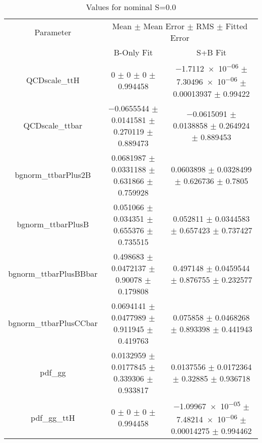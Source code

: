 \begin{table}
\centering
\caption{Values for nominal S=0.0}
\begin{tabular}{ccc}
\toprule
Parameter & \multicolumn{2}{c}{Mean $\pm$ Mean Error $\pm$ RMS $\pm$ Fitted Error}\\
 & B-Only Fit & S+B Fit\\
\midrule
QCDscale\_ttH & \num{0} $\pm$ \num{0} $\pm$ \num{0} $\pm$ \num{0.994458} & \num{-1.7112e-06} $\pm$ \num{7.30496e-06} $\pm$ \num{0.00013937} $\pm$ \num{0.99422}\\
QCDscale\_ttbar & \num{-0.0655544} $\pm$ \num{0.0141581} $\pm$ \num{0.270119} $\pm$ \num{0.889473} & \num{-0.0615091} $\pm$ \num{0.0138858} $\pm$ \num{0.264924} $\pm$ \num{0.889453}\\
bgnorm\_ttbarPlus2B & \num{0.0681987} $\pm$ \num{0.0331188} $\pm$ \num{0.631866} $\pm$ \num{0.759928} & \num{0.0603898} $\pm$ \num{0.0328499} $\pm$ \num{0.626736} $\pm$ \num{0.7805}\\
bgnorm\_ttbarPlusB & \num{0.051066} $\pm$ \num{0.034351} $\pm$ \num{0.655376} $\pm$ \num{0.735515} & \num{0.052811} $\pm$ \num{0.0344583} $\pm$ \num{0.657423} $\pm$ \num{0.737427}\\
bgnorm\_ttbarPlusBBbar & \num{0.498683} $\pm$ \num{0.0472137} $\pm$ \num{0.90078} $\pm$ \num{0.179808} & \num{0.497148} $\pm$ \num{0.0459544} $\pm$ \num{0.876755} $\pm$ \num{0.232577}\\
bgnorm\_ttbarPlusCCbar & \num{0.0694141} $\pm$ \num{0.0477989} $\pm$ \num{0.911945} $\pm$ \num{0.419763} & \num{0.075858} $\pm$ \num{0.0468268} $\pm$ \num{0.893398} $\pm$ \num{0.441943}\\
pdf\_gg & \num{0.0132959} $\pm$ \num{0.0177845} $\pm$ \num{0.339306} $\pm$ \num{0.933817} & \num{0.0137556} $\pm$ \num{0.0172364} $\pm$ \num{0.32885} $\pm$ \num{0.936718}\\
pdf\_gg\_ttH & \num{0} $\pm$ \num{0} $\pm$ \num{0} $\pm$ \num{0.994458} & \num{-1.09967e-05} $\pm$ \num{7.48214e-06} $\pm$ \num{0.00014275} $\pm$ \num{0.994462}\\
\bottomrule
\end{tabular}
\end{table}